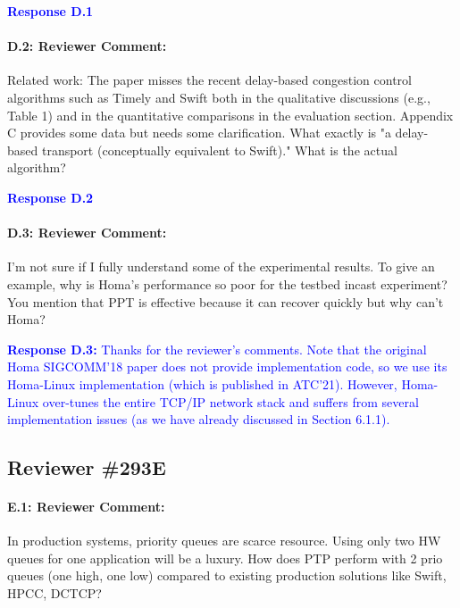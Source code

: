\documentclass[12pt,one-column]{article}
\begin{document}
\noindent\textcolor{blue}{\textbf{Response D.1}
} 

{\it \paragraph{D.2: Reviewer Comment:}Related work: The paper misses the recent delay-based congestion control algorithms such as Timely and Swift both in the qualitative discussions (e.g., Table 1) and in the quantitative comparisons in the evaluation section. Appendix C provides some data but needs some clarification. What exactly is "a delay-based transport (conceptually equivalent to Swift)." What is the actual algorithm?}

\noindent\textcolor{blue}{\textbf{Response D.2}
} 


{\it \paragraph{D.3: Reviewer Comment:} I'm not sure if I fully understand some of the experimental results. To give an example, why is Homa's performance so poor for the testbed incast experiment? You mention that PPT is effective because it can recover quickly but why can't Homa?}


\noindent\textcolor{blue}{\textbf{Response D.3:}
Thanks for the reviewer's comments.
Note that the original Homa SIGCOMM'18 paper does not provide implementation code, so we use its Homa-Linux implementation (which is published in ATC'21).
However, Homa-Linux over-tunes the entire TCP/IP network stack and suffers from several implementation issues (as we have already discussed in Section 6.1.1).
}

\subsection{Reviewer \#293E}

{\it \paragraph{E.1: Reviewer Comment:} In production systems, priority queues are scarce resource. Using only two HW queues for one application will be a luxury. How does PTP perform with 2 prio queues (one high, one low) compared to existing production solutions like Swift, HPCC, DCTCP?}
\end{document}
